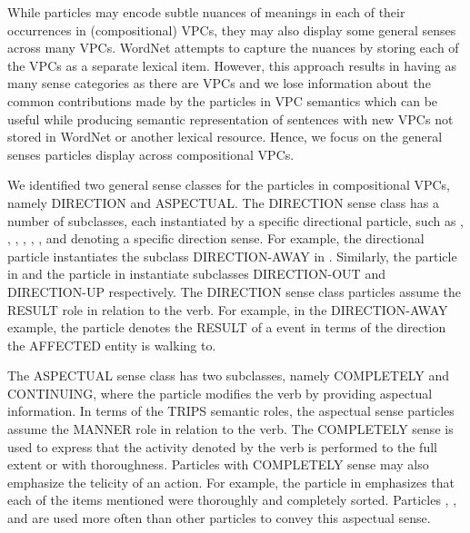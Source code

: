 \documentclass[output=paper
,modfonts
,nonflat]{langsci/langscibook}
\begin{document}
While particles may encode subtle nuances of meanings in each of their occurrences in (compositional) VPCs, they may also display some general senses across many VPCs. WordNet attempts to capture the nuances by storing each of the VPCs as a separate lexical item. However, this approach results in having as many sense categories as there are VPCs and we lose information about the common contributions made by the particles in VPC semantics which can be useful while producing semantic representation of sentences with new VPCs not stored in WordNet or another lexical resource. Hence, we focus on the general senses particles display across compositional VPCs. 

We identified two general sense classes for the particles in compositional VPCs, namely DIRECTION and ASPECTUAL. The DIRECTION sense class has a number of subclasses, each instantiated by a specific directional particle, such as , , , , , , and  denoting a specific direction sense. For example, the directional particle  instantiates the subclass DIRECTION-AWAY in . Similarly, the particle  in  and the particle  in  instantiate subclasses DIRECTION-OUT and DIRECTION-UP respectively. The DIRECTION sense class particles assume the RESULT role in relation to the verb. For example, in the DIRECTION-AWAY example, the particle  denotes the RESULT of a  event in terms of the direction the AFFECTED entity is walking to.

The ASPECTUAL sense class has two subclasses, namely COMPLETELY and CONTINUING, where the particle modifies the verb by providing aspectual information. In terms of the TRIPS semantic roles, the aspectual sense particles assume the MANNER role in relation to the verb. The COMPLETELY sense is used to express that the activity denoted by the verb is performed to the full extent or with thoroughness. Particles with COMPLETELY sense may also emphasize the telicity of an action. For example, the particle  in  emphasizes that each of the items mentioned were thoroughly and completely sorted. Particles , , and  are used more often than other particles to convey this aspectual sense.
\end{document}
